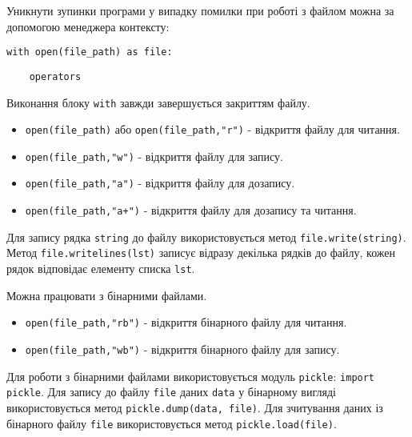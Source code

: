 \begin{frame}
Уникнути зупинки програми у випадку помилки при роботі з файлом можна за допомогою менеджера контексту:

\texttt{with open(file\_path) as file:}

\texttt{~~~~operators}

Виконання блоку \texttt{with} завжди завершується закриттям файлу.

\end{frame}

\begin{frame}
\begin{itemize}
  \item \texttt{open(file\_path)} або \texttt{open(file\_path,"r")} - відкриття файлу для читання.
  \item \texttt{open(file\_path,"w")} - відкриття файлу для запису.
  \item \texttt{open(file\_path,"a")} - відкриття файлу для дозапису.
  \item \texttt{open(file\_path,"a+")} - відкриття файлу для дозапису та читання.
\end{itemize}
Для запису рядка \texttt{string} до файлу використовується метод \texttt{file.write(string)}. Метод \texttt{file.writelines(lst)} записує відразу декілька рядків до файлу, кожен рядок відповідає елементу списка \texttt{lst}.
\end{frame}

\begin{frame}
Можна працювати з бінарними файлами.
\begin{itemize}
  \item \texttt{open(file\_path,"rb")} - відкриття бінарного файлу для читання.
  \item \texttt{open(file\_path,"wb")} - відкриття бінарного файлу для запису.
\end{itemize}
Для роботи з бінарними файлами використовується модуль \texttt{pickle}: \texttt{import pickle}.
Для запису до файлу \texttt{file} даних \texttt{data} у бінарному вигляді використовується метод \texttt{pickle.dump(data, file)}. Для зчитування даних із бінарного файлу \texttt{file} використовується метод \texttt{pickle.load(file)}.
\end{frame}
